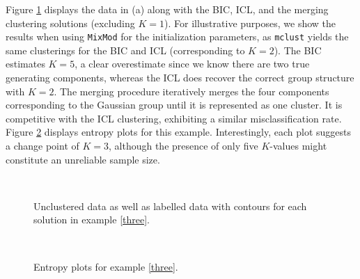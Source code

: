 \documentclass{uwstat572}
\renewcommand\;{\,}
\begin{document}
Figure \ref{Example3} displays the data in (a) along with the BIC, ICL, and the merging clustering solutions (excluding $K = 1$).
For illustrative purposes, we show the results when using \texttt{MixMod} for the initialization parameters, as \texttt{mclust} yields the same clusterings for the BIC and ICL (corresponding to $K = 2$).
The BIC estimates $K = 5$, a clear overestimate since we know there are two true generating components, whereas the ICL does recover the correct group structure with $K = 2$.
The merging procedure iteratively merges the four components corresponding to the Gaussian group until it is represented as one cluster.
It is competitive with the ICL clustering, exhibiting a similar misclassification rate. 
Figure \ref{Entropy3} displays entropy plots for this example.
Interestingly, each plot suggests a change point of $K = 3$, although the presence of only five $K$-values might constitute an unreliable sample size.

  
\begin{figure}
\begin{center}
\\ \vspace{-1em}
\end{center}
\caption{Unclustered data as well as labelled data with contours for each solution in example \ref{three}.}
\label{Example3}
\end{figure}

\begin{figure}
\begin{center}
\\ \vspace{-1em}
\end{center}
\caption{Entropy plots for example \ref{three}.}
\label{Entropy3}
\end{figure}
\end{document}
